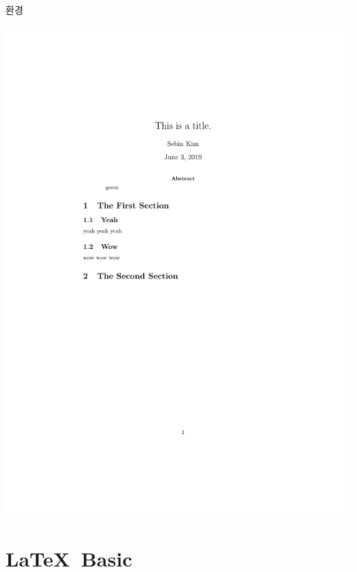 \documentclass[12pt]{gshs_lecture}
\begin{document}
\begin{frame}[t]{환경}
\begin{framed}
	\includegraphics[width=\textwidth,trim={3cm 14.5cm 3cm 6cm},clip]{./pdfs/ex6.pdf}
\end{framed}
\end{frame}

\section{\LaTeX\ Basic}
\end{document}
